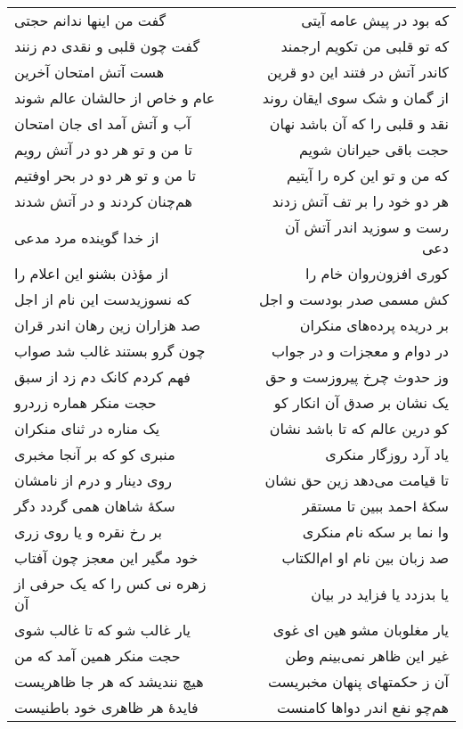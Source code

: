 \begin{center}
\begin{longtable}{l p{0.5cm} r}
گفت من اینها ندانم حجتی
&&
که بود در پیش عامه آیتی
\\
گفت چون قلبی و نقدی دم زنند
&&
که تو قلبی من تکویم ارجمند
\\
هست آتش امتحان آخرین
&&
کاندر آتش در فتند این دو قرین
\\
عام و خاص از حالشان عالم شوند
&&
از گمان و شک سوی ایقان روند
\\
آب و آتش آمد ای جان امتحان
&&
نقد و قلبی را که آن باشد نهان
\\
تا من و تو هر دو در آتش رویم
&&
حجت باقی حیرانان شویم
\\
تا من و تو هر دو در بحر اوفتیم
&&
که من و تو این کره را آیتیم
\\
هم‌چنان کردند و در آتش شدند
&&
هر دو خود را بر تف آتش زدند
\\
از خدا گوینده مرد مدعی
&&
رست و سوزید اندر آتش آن دعی
\\
از مؤذن بشنو این اعلام را
&&
کوری افزون‌روان خام را
\\
که نسوزیدست این نام از اجل
&&
کش مسمی صدر بودست و اجل
\\
صد هزاران زین رهان اندر قران
&&
بر دریده پرده‌های منکران
\\
چون گرو بستند غالب شد صواب
&&
در دوام و معجزات و در جواب
\\
فهم کردم کانک دم زد از سبق
&&
وز حدوث چرخ پیروزست و حق
\\
حجت منکر هماره زردرو
&&
یک نشان بر صدق آن انکار کو
\\
یک مناره در ثنای منکران
&&
کو درین عالم که تا باشد نشان
\\
منبری کو که بر آنجا مخبری
&&
یاد آرد روزگار منکری
\\
روی دینار و درم از نامشان
&&
تا قیامت می‌دهد زین حق نشان
\\
سکهٔ شاهان همی گردد دگر
&&
سکهٔ احمد ببین تا مستقر
\\
بر رخ نقره و یا روی زری
&&
وا نما بر سکه نام منکری
\\
خود مگیر این معجز چون آفتاب
&&
صد زبان بین نام او ام‌الکتاب
\\
زهره نی کس را که یک حرفی از آن
&&
یا بدزدد یا فزاید در بیان
\\
یار غالب شو که تا غالب شوی
&&
یار مغلوبان مشو هین ای غوی
\\
حجت منکر همین آمد که من
&&
غیر این ظاهر نمی‌بینم وطن
\\
هیچ نندیشد که هر جا ظاهریست
&&
آن ز حکمتهای پنهان مخبریست
\\
فایدهٔ هر ظاهری خود باطنیست
&&
هم‌چو نفع اندر دواها کامنست
\\
\end{longtable}
\end{center}
